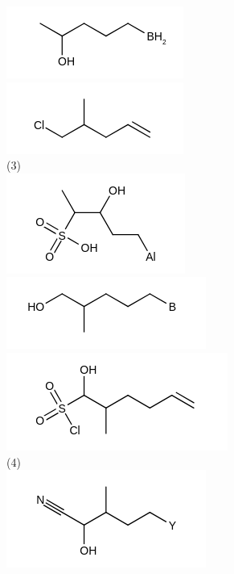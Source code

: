 \documentclass[10pt]{article}
\begin{document}
\includegraphics{smile-14dd4e4685ab70b96f6fffd8ca65d1789ed7df08}\\
\includegraphics{smile-9a853e81853682edad0e14412603e6539fcf709c}\\
(3)\\
\includegraphics{smile-cb476d59bcc8da16a3bdd1d2a6859d76dc9d1937}\\
\includegraphics{smile-4cc67497d98ef15442dab8abff1abb6d61401f3c}\\
\includegraphics{smile-8a6421d2581512c4c8c4898d79c5d9262a92b5b9}\\
(4)\\
\includegraphics{smile-6cecab6ba6c51d23896f779aa7e4ff5a1443a33b}\\
\end{document}
